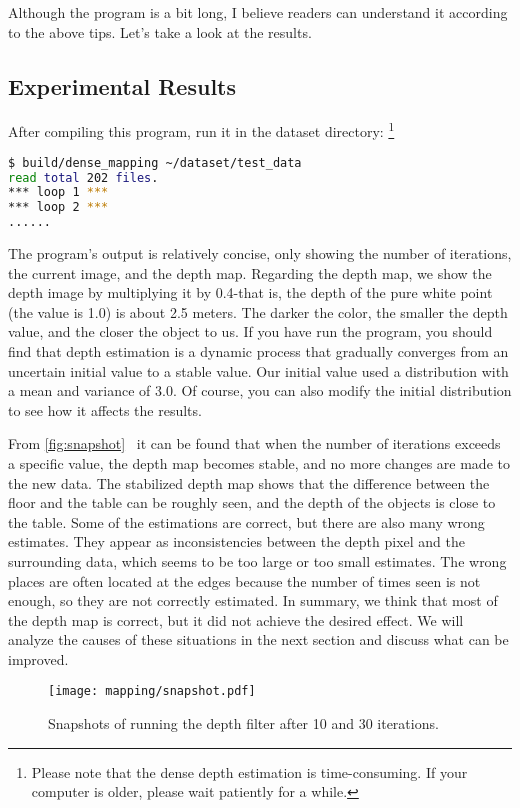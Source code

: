 Although the program is a bit long, I believe readers can understand it according to the above tips. Let's take a look at the results.

\subsection*{Experimental Results}
After compiling this program, run it in the dataset directory: \footnote{Please note that the dense depth estimation is time-consuming. If your computer is older, please wait patiently for a while. }
\begin{lstlisting}[language=sh,caption=Terminal ouptut:]
$ build/dense_mapping ~/dataset/test_data 
read total 202 files.
*** loop 1 ***
*** loop 2 ***
......
\end{lstlisting}


The program's output is relatively concise, only showing the number of iterations, the current image, and the depth map. Regarding the depth map, we show the depth image by multiplying it by 0.4-that is, the depth of the pure white point (the value is 1.0) is about 2.5 meters. The darker the color, the smaller the depth value, and the closer the object to us. If you have run the program, you should find that depth estimation is a dynamic process that gradually converges from an uncertain initial value to a stable value. Our initial value used a distribution with a mean and variance of 3.0. Of course, you can also modify the initial distribution to see how it affects the results.

From \autoref{fig:snapshot}~ it can be found that when the number of iterations exceeds a specific value, the depth map becomes stable, and no more changes are made to the new data. The stabilized depth map shows that the difference between the floor and the table can be roughly seen, and the depth of the objects is close to the table. Some of the estimations are correct, but there are also many wrong estimates. They appear as inconsistencies between the depth pixel and the surrounding data, which seems to be too large or too small estimates. The wrong places are often located at the edges because the number of times seen is not enough, so they are not correctly estimated. In summary, we think that most of the depth map is correct, but it did not achieve the desired effect. We will analyze the causes of these situations in the next section and discuss what can be improved.

\begin{figure}[!ht]
	\centering
	\texttt{[image: mapping/snapshot.pdf]}
	\caption{Snapshots of running the depth filter after 10 and 30 iterations. }
	\label{fig:snapshot}
\end{figure}

